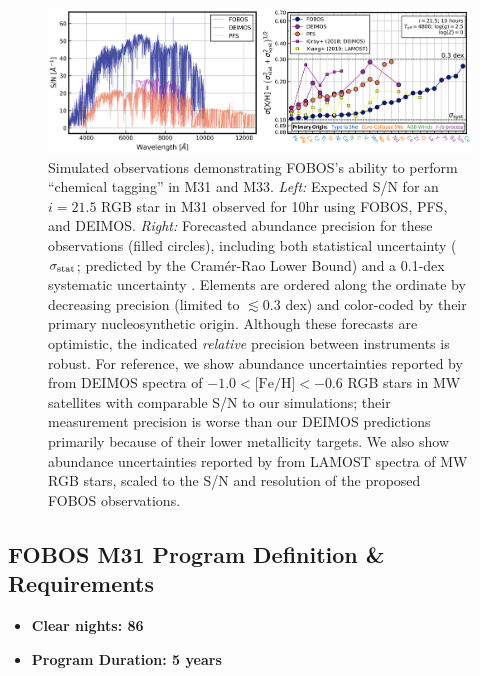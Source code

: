 \documentclass[11pt,a4paper,twoside,onecolumn,openany,final,oldfontcommands]{memoir}
\begin{document}
\begin{figure}
\includegraphics[width=1.0\textwidth]{figs/abundances_snr_v6.png}
\caption[Simulated M31 RGB spectra and abundance forecasts]{Simulated observations demonstrating FOBOS's ability to perform ``chemical tagging'' in M31 and M33. \textit{Left:} Expected S/N for an $i=21.5$ RGB star in M31 observed for 10hr using FOBOS, PFS, and DEIMOS. \textit{Right:}  Forecasted abundance precision for these observations (filled circles), including both statistical uncertainty ($\sigma_{\rm stat}$; predicted by the Cram\'er-Rao Lower Bound) and a 0.1-dex systematic uncertainty \citep[$\sigma_{\rm syst}$; cf.,][]{kirby18, xiang2019}. Elements are ordered along the ordinate by decreasing precision (limited to $\lesssim$0.3 dex) and color-coded by their primary nucleosynthetic origin. Although these forecasts are optimistic, the indicated \textit{relative} precision between instruments is robust. For reference, we show abundance uncertainties reported by \citet[][purple squares]{kirby18} from DEIMOS spectra of $-1.0<\text{[Fe/H]}<-0.6$ RGB stars in MW satellites with comparable S/N to our simulations; their measurement precision is worse than our DEIMOS predictions primarily because of their lower metallicity targets.  We also show abundance uncertainties reported by \citet[][yellow squares]{xiang2019} from LAMOST spectra of MW RGB stars, scaled to the S/N and resolution of the proposed FOBOS  observations.}
\label{fig:abundances_snr}
\end{figure}





\subsection{FOBOS M31 Program Definition \& Requirements}

\medskip
\begin{itemize}[leftmargin=0.3in, itemsep=0pt]
	\item[] \textbf{Clear nights: 86}
	\item[] \textbf{Program Duration: 5 years}
\end{itemize}
\end{document}
